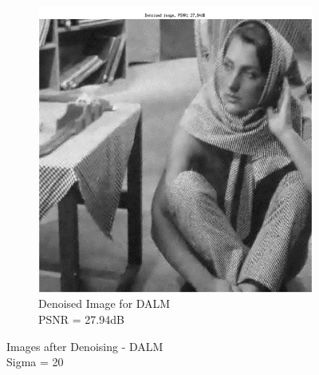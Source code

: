 \documentclass{article} %
\begin{document}
\begin{figure}[h]
\begin{subfigure}[b]{0.5\textwidth}
                \includegraphics[width=\textwidth]{images/Denoised_DALM}
                \caption{Denoised Image for DALM\\PSNR = 27.94dB}
                \label{fig:DenoisedDALM}
        \end{subfigure}
        \caption{Images after Denoising - DALM\\Sigma = 20}\label{fig:DenoiseDALM}
\end{figure}
\end{document}
